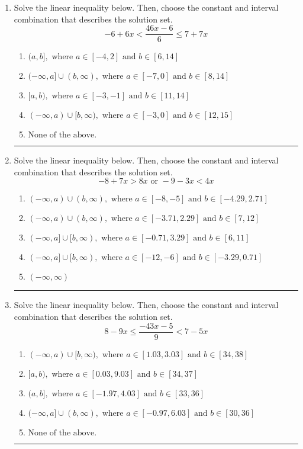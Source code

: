 \documentclass[14pt]{extbook}
\newcommand{\litem}[1]{\item#1\hspace*{-1cm}\rule{\textwidth}{0.4pt}}
\begin{document}
\begin{enumerate}
\litem{
Solve the linear inequality below. Then, choose the constant and interval combination that describes the solution set.\[ -6 + 6 x < \frac{46 x - 6}{6} \leq 7 + 7 x \]\begin{enumerate}[label=\Alph*.]
\item \( (a, b], \text{ where } a \in [-4, 2] \text{ and } b \in [6, 14] \)
\item \( (-\infty, a] \cup (b, \infty), \text{ where } a \in [-7, 0] \text{ and } b \in [8, 14] \)
\item \( [a, b), \text{ where } a \in [-3, -1] \text{ and } b \in [11, 14] \)
\item \( (-\infty, a) \cup [b, \infty), \text{ where } a \in [-3, 0] \text{ and } b \in [12, 15] \)
\item \( \text{None of the above.} \)

\end{enumerate} }
\litem{
Solve the linear inequality below. Then, choose the constant and interval combination that describes the solution set.\[ -8 + 7 x > 8 x \text{ or } -9 - 3 x < 4 x \]\begin{enumerate}[label=\Alph*.]
\item \( (-\infty, a) \cup (b, \infty), \text{ where } a \in [-8, -5] \text{ and } b \in [-4.29, 2.71] \)
\item \( (-\infty, a) \cup (b, \infty), \text{ where } a \in [-3.71, 2.29] \text{ and } b \in [7, 12] \)
\item \( (-\infty, a] \cup [b, \infty), \text{ where } a \in [-0.71, 3.29] \text{ and } b \in [6, 11] \)
\item \( (-\infty, a] \cup [b, \infty), \text{ where } a \in [-12, -6] \text{ and } b \in [-3.29, 0.71] \)
\item \( (-\infty, \infty) \)

\end{enumerate} }
\litem{
Solve the linear inequality below. Then, choose the constant and interval combination that describes the solution set.\[ 8 - 9 x \leq \frac{-43 x - 5}{9} < 7 - 5 x \]\begin{enumerate}[label=\Alph*.]
\item \( (-\infty, a) \cup [b, \infty), \text{ where } a \in [1.03, 3.03] \text{ and } b \in [34, 38] \)
\item \( [a, b), \text{ where } a \in [0.03, 9.03] \text{ and } b \in [34, 37] \)
\item \( (a, b], \text{ where } a \in [-1.97, 4.03] \text{ and } b \in [33, 36] \)
\item \( (-\infty, a] \cup (b, \infty), \text{ where } a \in [-0.97, 6.03] \text{ and } b \in [30, 36] \)
\item \( \text{None of the above.} \)


\end{enumerate}}
\end{enumerate}
\end{document}
